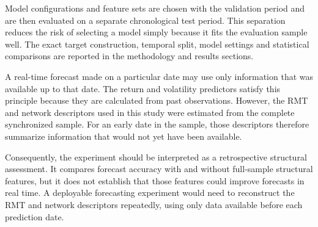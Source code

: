 Model configurations and feature sets are chosen with the validation period and are then evaluated on a separate chronological test period. This separation reduces the risk of selecting a model simply because it fits the evaluation sample well. The exact target construction, temporal split, model settings and statistical comparisons are reported in the methodology and results sections.

A real-time forecast made on a particular date may use only information that was available up to that date. The return and volatility predictors satisfy this principle because they are calculated from past observations. However, the RMT and network descriptors used in this study were estimated from the complete synchronized sample. For an early date in the sample, those descriptors therefore summarize information that would not yet have been available.

Consequently, the experiment should be interpreted as a retrospective structural assessment. It compares forecast accuracy with and without full-sample structural features, but it does not establish that those features could improve forecasts in real time. A deployable forecasting experiment would need to reconstruct the RMT and network descriptors repeatedly, using only data available before each prediction date.

